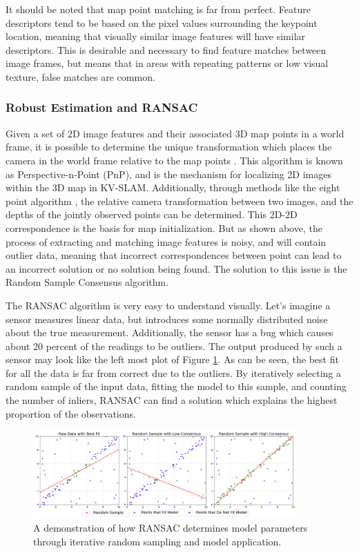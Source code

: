 It should be noted that map point matching is far from perfect. Feature descriptors tend to be based on the pixel values surrounding the keypoint location, meaning that visually similar image features will have similar descriptors. This is desirable and necessary to find feature matches between image frames, but means that in areas with repeating patterns or low visual texture, false matches are common.

\subsubsection{Robust Estimation and RANSAC}

Given a set of 2D image features and their associated 3D map points in a world frame, it is possible to determine the unique transformation which places the camera in the world frame relative to the map points \cite{longuet-higginsComputerAlgorithmReconstructing1981}. This algorithm is known as Perspective-n-Point (PnP), and is the mechanism for localizing 2D images within the 3D map in KV-SLAM. Additionally, through methods like the eight point algorithm \cite{hartleyDefenseEightpointAlgorithm1997}, the relative camera transformation between two images, and the depths of the jointly observed points can be determined. This 2D-2D correspondence is the basis for map initialization. But as shown above, the process of extracting and matching image features is noisy, and will contain outlier data, meaning that incorrect correspondences between point can lead to an incorrect solution or no solution being found. The solution to this issue is the Random Sample Consensus algorithm.

The RANSAC algorithm is very easy to understand visually. Let's imagine a sensor measures linear data, but introduces some normally distributed noise about the true measurement. Additionally, the sensor has a bug which causes about 20 percent of the readings to be outliers. The output produced by such a sensor may look like the left most plot of Figure \ref{fig:ransac}. As can be seen, the best fit for all the data is far from correct due to the outliers. By iteratively selecting a random sample of the input data, fitting the model to this sample, and counting the number of inliers, RANSAC can find a solution which explains the highest proportion of the observations.

\begin{figure}[!ht]
    \centering
    \includegraphics[width=0.9\textwidth]{resources/ransac.png}
    \caption[2D RANSAC Example]{A demonstration of how RANSAC determines model parameters through iterative random sampling and model application.}
    \label{fig:ransac}
\end{figure}

